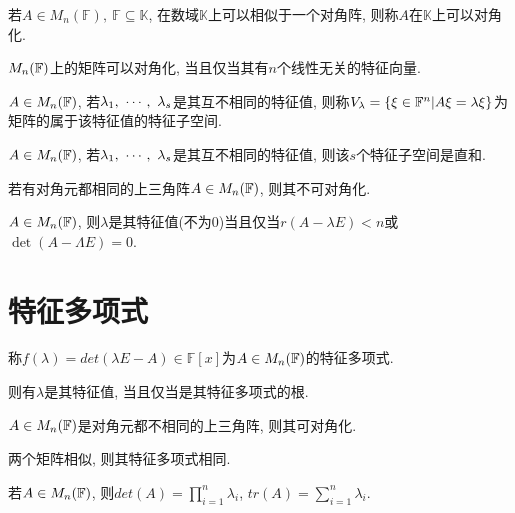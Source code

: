 \begin{definition}[可对角化]
    若$A\in M_n(\mathbb{F}), \ \mathbb{F}\subseteq \mathbb{K}$, 在数域$\mathbb{K}$上可以相似于一个对角阵, 则称$A$在$\mathbb{K}$上可以对角化.
\end{definition}

\begin{inference}
    $M_{n}(\mathbb{F})$上的矩阵可以对角化, 当且仅当其有$n$个线性无关的特征向量.
\end{inference}

\begin{definition}[特征子空间]
    $A\in M_{n}(\mathbb{F})$, 若${\lambda}{_1},\ \cdots,\ {\lambda}{_{s}}$是其互不相同的特征值, 则称$V_{\lambda}=\{\xi\in \mathbb{F}^n|A\xi=\lambda \xi\}$为矩阵的属于该特征值的特征子空间.
\end{definition}

\begin{lemma}
    $A\in M_{n}(\mathbb{F})$, 若${\lambda}{_1},\ \cdots,\ {\lambda}{_{s}}$是其互不相同的特征值, 则该$s$个特征子空间是直和.
\end{lemma}

\begin{inference}
    若有对角元都相同的上三角阵$A\in M_{n}(\mathbb{F})$, 则其不可对角化.
\end{inference}

\begin{lemma}
    $A\in M_{n}(\mathbb{F})$, 则$\lambda$是其特征值(不为0)当且仅当$r(A-\lambda E)<n$或$\det(A-\Lambda E)=0$.
\end{lemma}

\section{ 特征多项式 }

\begin{definition}[特征多项式]
    称$f(\lambda)=det(\lambda E-A)\in \mathbb{F}[x]$为$A\in M_{n}(\mathbb{F})$的特征多项式.\par
    则有$\lambda$是其特征值, 当且仅当是其特征多项式的根.
\end{definition}

\begin{inference}
    $A\in M_{n}(\mathbb{F})$是对角元都不相同的上三角阵, 则其可对角化.
\end{inference}

\begin{inference}
    两个矩阵相似, 则其特征多项式相同.
\end{inference}

\begin{inference}
    若$A\in M_{n}(\mathbb{F})$, 则$det(A)=\prod_{i=1}^n\lambda{_i}$, $tr(A)=\sum_{i=1}^n\lambda{_i}$.
\end{inference}

